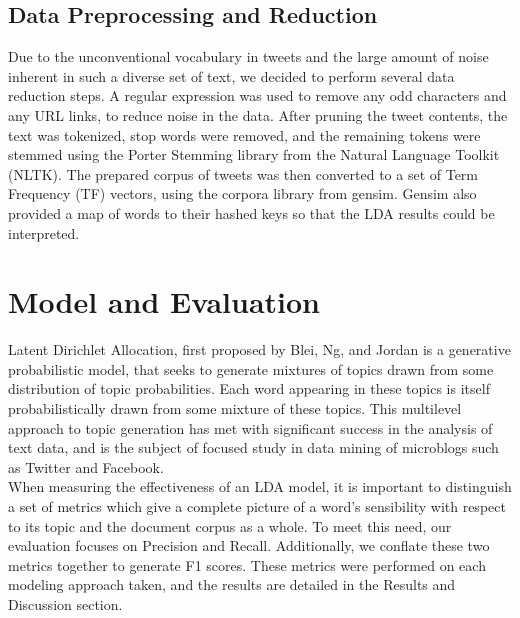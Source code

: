 \documentclass{acm_proc_article-sp}
\begin{document}
\subsection{Data Preprocessing and Reduction}
\hspace*{5mm}Due to the unconventional vocabulary in tweets and the large amount of noise inherent in such a diverse set of text, we decided to perform several data reduction steps. A regular expression was used to remove any odd characters and any URL links, to reduce noise in the data. After pruning the tweet contents, the text was tokenized, stop words were removed, and the remaining tokens were stemmed using the Porter Stemming library from the Natural Language Toolkit (NLTK). The prepared corpus of tweets was then converted to a set of Term Frequency (TF) vectors, using the corpora library from gensim. Gensim also provided a map of words to their hashed keys so that the LDA results could be interpreted.

\section{Model and Evaluation}
\hspace*{5mm}Latent Dirichlet Allocation, first proposed by Blei, Ng, and Jordan \cite{blei2003latent} is a generative probabilistic model, that seeks to generate mixtures of topics drawn from some distribution of topic probabilities. Each word appearing in these topics is itself probabilistically drawn from some mixture of these topics. This multilevel approach to topic generation has met with significant success in the analysis of text data, and is the subject of focused study in data mining of microblogs such as Twitter and Facebook.\\
\hspace*{5mm}When measuring the effectiveness of an LDA model, it is important to distinguish a set of metrics which give a complete picture of a word's sensibility with respect to its topic and the document corpus as a whole. To meet this need, our evaluation focuses on Precision and Recall. Additionally, we conflate these two metrics together to generate F1 scores. These metrics were performed on each modeling approach taken, and the results are detailed in the Results and Discussion section.
\end{document}
